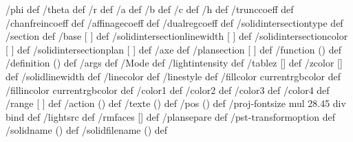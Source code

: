 /phi \pst@solides@phi\space def %
/theta \pst@solides@theta\space def %
/r \pst@solides@r\space def %
/a \pst@solides@a\space def %
/b \pst@solides@b\space def %
/c \pst@solides@c\space def %
/h \pst@solides@h\space def %
/trunccoeff \pst@solides@trunccoeff\space def %
/chanfreincoeff \pst@solides@chanfreincoeff\space def %
/affinagecoeff \pst@solides@affinagecoeff\space def %
/dualregcoeff \pst@solides@dualregcoeff\space def %
/solidintersectiontype \pst@solides@intersectiontype\space def %
/section {\pst@solides@section} def %
/base [ \pst@solides@base ] def
/solidintersectionlinewidth [ \pst@solides@intersectionlinewidth ] def
/solidintersectioncolor [ \pst@solides@intersectioncolor ] def
/solidintersectionplan [ \pst@solides@intersectionplan ] def
/axe  { \pst@solides@axe } def
/plansection  [ \pst@solides@plansection ] def
\ifx\pst@solides@function\@empty\else /function (\pst@solides@function) def \fi
%
/definition  (\pst@solides@definition) def
/args  { \pst@solides@args} def
/Mode \pst@solides@mode\space def %
/lightintensity \pst@solides@lightintensity\space def %
/tablez  [\pst@solides@tablez] def
/zcolor  [\pst@solides@zcolor] def
%
/solidlinewidth {\pst@number\pslinewidth} def
/linecolor  {\pst@usecolor\pslinecolor} def
/linestyle  {\pslinestyle} def
/fillcolor  {\pst@usecolor\psfillcolor currentrgbcolor} def
/fillincolor  {\pst@usecolor\psincolor currentrgbcolor} def
%
/color1 {\pst@usecolor\pscolora } def
/color2 {\pst@usecolor\pscolorb } def
/color3 {\pst@usecolor\pscolorc } def
/color4 {\pst@usecolor\pscolord } def
%
/range [ \pst@solides@range ] def
/action (\pst@solides@action) def
/texte (\pst@solides@text) def
/pos (\pst@solides@pos) def
/proj-fontsize {\pst@solides@fontsize\space \pst@number\psunit mul 28.45 div } bind def
%
\ifx\pst@solides@CoordinatesLight\@empty\else /lightsrc {\pst@solides@CoordinatesLight} def \fi
%
/rmfaces [\pst@solides@CoordinatesRm] def
\ifx\pst@solides@plansepare\@empty\else/plansepare {\pst@solides@plansepare} def\fi
\ifx\pst@solides@transform\@empty \else/pst-transformoption { \pst@solides@transform} def\fi
\ifx\pst@solides@name\@empty      \else/solidname (\pst@solides@name) def\fi
\ifx\pst@solides@file\@empty      \else/solidfilename (\pst@solides@file) def\fi
